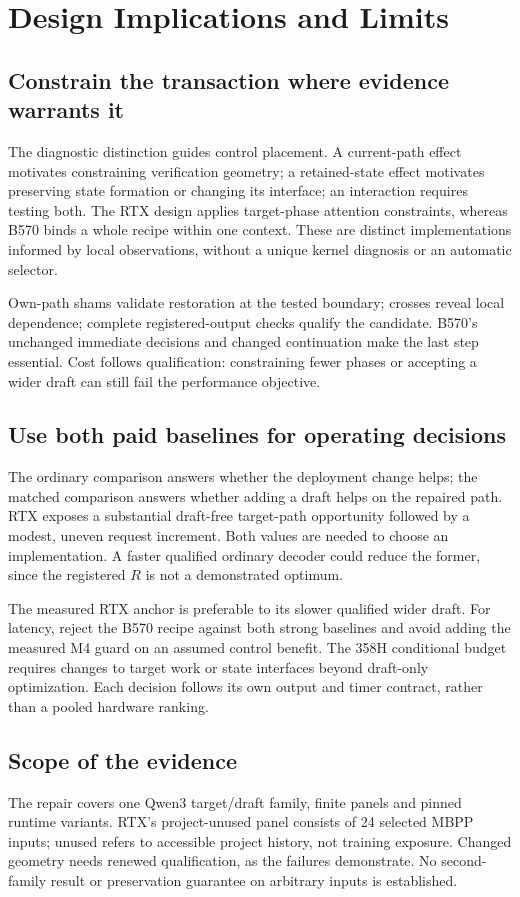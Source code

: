 \section{Design Implications and Limits}
\label{sec:implications}
\subsection{Constrain the transaction where evidence warrants it}
The diagnostic distinction guides control placement. A current-path effect motivates constraining verification geometry; a retained-state effect motivates preserving state formation or changing its interface; an interaction requires testing both. The RTX design applies target-phase attention constraints, whereas B570 binds a whole recipe within one context. These are distinct implementations informed by local observations, without a unique kernel diagnosis or an automatic selector.

Own-path shams validate restoration at the tested boundary; crosses reveal local dependence; complete registered-output checks qualify the candidate. B570's unchanged immediate decisions and changed continuation make the last step essential. Cost follows qualification: constraining fewer phases or accepting a wider draft can still fail the performance objective.

\subsection{Use both paid baselines for operating decisions}
The ordinary comparison answers whether the deployment change helps; the matched comparison answers whether adding a draft helps on the repaired path. RTX exposes a substantial draft-free target-path opportunity followed by a modest, uneven request increment. Both values are needed to choose an implementation. A faster qualified ordinary decoder could reduce the former, since the registered $R$ is not a demonstrated optimum.

The measured RTX anchor is preferable to its slower qualified wider draft. For latency, reject the B570 recipe against both strong baselines and avoid adding the measured M4 guard on an assumed control benefit. The 358H conditional budget requires changes to target work or state interfaces beyond draft-only optimization. Each decision follows its own output and timer contract, rather than a pooled hardware ranking.

\subsection{Scope of the evidence}
The repair covers one Qwen3 target/draft family, finite panels and pinned runtime variants. RTX's project-unused panel consists of 24 selected MBPP inputs; unused refers to accessible project history, not training exposure. Changed geometry needs renewed qualification, as the failures demonstrate. No second-family result or preservation guarantee on arbitrary inputs is established.


